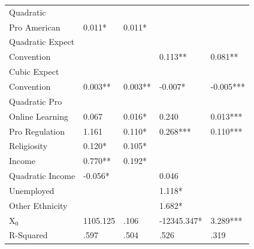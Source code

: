 \documentclass[review]{elsarticle}
\begin{document}
\begin{table}
\begin{tabular}{lllll}
            Quadratic
            \\Pro American & 0.011* & 0.011* \\ %
            Quadratic Expect
            \\Convention &  &  & 0.113** & 0.081** \\ %
            Cubic Expect
            \\Convention & 0.003** & 0.003** & -0.007* & -0.005*** \\ %
            Quadratic Pro
            \\Online Learning & 0.067 & 0.016* & 0.240 & 0.013*** \\ %
            Pro Regulation & 1.161 & 0.110* & 0.268*** & 0.110*** \\ %
            Religiosity & 0.120* & 0.105* \\ %
            Income & 0.770** & 0.192* \\ %
            Quadratic Income & -0.056* &  & 0.046 &  \\ %
            Unemployed &  &  & 1.118* &  \\ %
            Other Ethnicity &  &  & 1.682* & \\ %
            X$_0$ & 1105.125 & .106 & -12345.347* & 3.289*** \\
            \bottomrule
            R-Squared & .597 & .504 & .526 & .319 %
        

\end{tabular}
\end{table}
\end{document}
